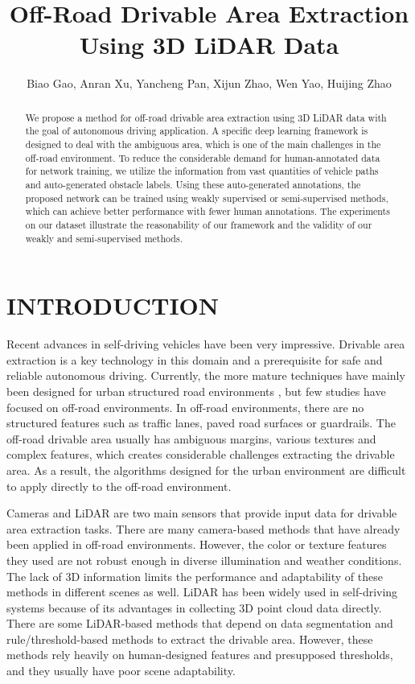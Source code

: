 \documentclass[letterpaper, 10 pt, conference]{ieeeconf}  %
\title{\LARGE \bf
Off-Road Drivable Area Extraction Using 3D LiDAR Data
}
\author{\authorblockN
	{Biao Gao\authorrefmark{1},
		Anran Xu\authorrefmark{1}, 
		Yancheng Pan\authorrefmark{1},
		Xijun Zhao\authorrefmark{2},
		Wen Yao\authorrefmark{2},
		Huijing Zhao\authorrefmark{1}}
	\authorblockA{\authorrefmark{1}Peking University, Beijing, China}
	\authorblockA{\authorrefmark{2}China North Vehicle Research Institute, Beijing, China}}
\begin{document}

\maketitle


\begin{abstract}
	
We propose a method for off-road drivable area extraction using 3D LiDAR data with the goal of autonomous driving application. A specific deep learning framework is designed to deal with the ambiguous area, which is one of the main challenges in the off-road environment. To reduce the considerable demand for human-annotated data for network training, we utilize the information from vast quantities of vehicle paths and auto-generated obstacle labels. Using these auto-generated annotations, the proposed network can be trained using weakly supervised or semi-supervised methods, which can achieve better performance with fewer human annotations. The experiments on our dataset illustrate the reasonability of our framework and the validity of our weakly  and semi-supervised methods.

\end{abstract}


\section{INTRODUCTION}

Recent advances in self-driving vehicles have been very impressive. Drivable area extraction is a key technology in this domain and a prerequisite for safe and reliable autonomous driving\cite{BarHillel2014}.
Currently, the more mature techniques have mainly been designed for urban structured road environments\cite{He2004}\cite{Alvarez2011}
, but few studies have focused on off-road environments. In off-road environments, there are no structured features such as traffic lanes, paved road surfaces or guardrails. The off-road drivable area usually has ambiguous margins, various textures and complex features, which creates considerable challenges extracting the drivable area.
As a result, the algorithms designed for the urban environment are difficult to apply directly to the off-road environment. 

Cameras and LiDAR are two main sensors that provide input data for drivable area extraction tasks. There are many camera-based methods that have already been applied in off-road environments\cite{Mei2018}.
However, the color or texture features they used are not robust enough in diverse illumination and weather conditions. The lack of 3D information limits the performance and adaptability of these methods in different scenes as well\cite{Xiao2015}.
LiDAR has been widely used in self-driving systems because of its advantages in collecting 3D point cloud data directly. There are some LiDAR-based methods that depend on data segmentation and rule/threshold-based methods to extract the drivable area\cite{Zhang2010}.
However, these methods rely heavily on human-designed features and presupposed thresholds, and they usually have poor scene adaptability. 
\end{document}
